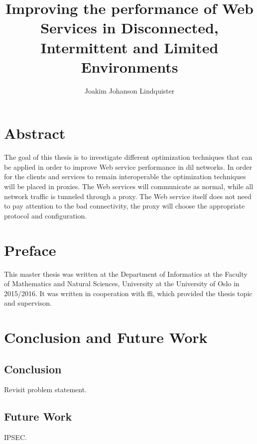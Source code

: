 \documentclass[USenglish]{ifimaster}
\title{Improving the performance of Web Services in Disconnected, Intermittent
and Limited Environments}
\author{Joakim Johanson Lindquister}
\begin{document}
\ififorside{}

\chapter*{Abstract}

The goal of this thesis is to investigate different optimization techniques that
can be applied in order to improve Web service performance in \gls{dil}
networks. In order for the clients and services to remain interoperable the
optimization techniques will be placed in proxies. The Web services will
communicate as normal, while all network traffic is tunneled through a proxy.
The Web service itself does not need to pay attention to the bad connectivity,
the proxy will choose the appropriate protocol and configuration.

\chapter*{Preface}

This master thesis was written at the Department of Informatics at the Faculty of Mathematics and Natural Sciences, University at the University of Oslo in 2015/2016. It was written in cooperation with \gls{ffi}, which provided the thesis topic and supervison.


\tableofcontents
\listoftables
\listoffigures

\pagebreak








\chapter{Conclusion and Future Work}
\label{chapter:conclusion}

\section{Conclusion}
Revisit problem statement.

\section{Future Work}

IPSEC.

\pagebreak
\printbibliography{}
\printglossaries{}


\end{document}
